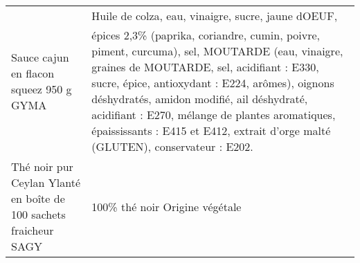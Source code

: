 \begin{longtable}{p{5cm}p{10cm}}
                                                                  Sauce cajun en flacon squeez 950 g GYMA &                                                                                                                                                                                                                                                                                                                                                                                                                                                                                                                                                                                                    Huile de colza, eau, vinaigre, sucre, jaune dOEUF, épices 2,3\% (paprika, coriandre, cumin, poivre, piment, curcuma), sel, MOUTARDE (eau, vinaigre, graines de MOUTARDE, sel, acidifiant : E330, sucre, épice, antioxydant : E224, arômes), oignons déshydratés, amidon modifié, ail déshydraté, acidifiant : E270, mélange de plantes aromatiques, épaississants : E415 et E412, extrait d'orge malté (GLUTEN), conservateur : E202. \\
                                      Thé noir pur Ceylan  Ylanté  en boîte de 100 sachets fraicheur SAGY &                                                                                                                                                                                                                                                                                                                                                                                                                                                                                                                                                                                                                                                                                                                                                                                                                                                                                                                                                                                                          100\% thé noir  Origine végétale \\

\end{longtable}
